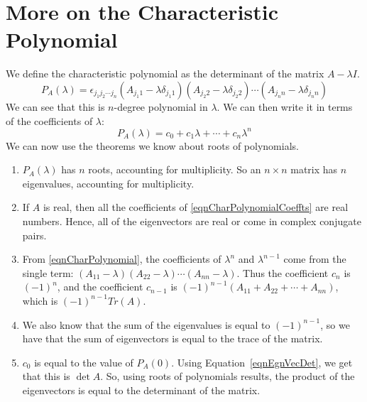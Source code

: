 \documentclass[../Main.tex]{subfiles}
\begin{document}
\section{More on the Characteristic Polynomial}
We define the characteristic polynomial as the determinant of the matrix $A - \lambda I$.
\begin{equation}\label{eqnCharPolynomial}
    P_A(\lambda) = \epsilon_{j_1 j_2 \cdots j_n}(A_{j_1 1} - \lambda \delta_{j_1 1})(A_{j_2 2} - \lambda \delta_{j_2 2}) \cdots (A_{j_n n} - \lambda \delta_{j_n n})
\end{equation}
We can see that this is $n$-degree polynomial in $\lambda$. We can then write it in terms of the coefficients of $\lambda$:
\begin{equation}\label{eqnCharPolynomialCoeffts}
    P_A(\lambda) = c_0 + c_1 \lambda + \cdots + c_n \lambda^n
\end{equation}
We can now use the theorems we know about roots of polynomials.
\begin{enumerate}
    \item $P_A(\lambda)$ has $n$ roots, accounting for multiplicity. So an $n \times n$ matrix has $n$ eigenvalues, accounting for multiplicity.
    \item If $A$ is real, then all the coefficients of \ref{eqnCharPolynomialCoeffts} are real numbers. Hence, all of the eigenvectors are real or come in complex conjugate pairs.
    \item From \ref{eqnCharPolynomial}, the coefficients of $\lambda^n$ and $\lambda^{n-1}$ come from the single term: $(A_{1 1} - \lambda)(A_{2 2} - \lambda) \cdots (A_{n n} - \lambda)$. Thus the coefficient $c_n$ is $(-1)^n$, and the coefficient $c_{n-1}$ is $(-1)^{n-1}(A_{1 1} + A_{2 2} + \cdots + A_{n n})$, which is $(-1)^{n-1} Tr(A)$.
    \item We also know that the sum of the eigenvalues is equal to $(-1)^{n-1}$, so we have that the sum of eigenvectors is equal to the trace of the matrix.
    \item $c_0$ is equal to the value of $P_A(0)$. Using Equation~\ref{eqnEgnVecDet}, we get that this is $\det{A}$. So, using roots of polynomials results, the product of the eigenvectors is equal to the determinant of the matrix.
\end{enumerate}
\end{document}
